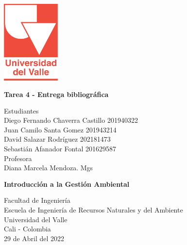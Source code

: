 \begin{titlepage}
    \begin{center}
        \vspace*{1cm}

        \begin{Huge}
        \end{Huge}

        \includegraphics[width=0.22\textwidth]{img/universidadDelValle.png}
        
        \vfill
        \textbf{Tarea 4 - Entrega bibliográfica}\\
        \vfill
        
        Estudiantes\\
        Diego Fernando Chaverra Castillo 201940322\\
        Juan Camilo Santa Gomez 201943214\\
        David Salazar Rodríguez 202181473\\
        Sebastián Afanador Fontal 201629587\\
        \vfill
        Profesora\\
        Diana Marcela Mendoza. Mgs
        
        
        \vfill

        \textbf{Introducción a la Gestión Ambiental}
        
        \vfill
           
        Facultad de Ingeniería\\
        Escuela de Ingeniería de Recursos Naturales y del Ambiente\\
        Universidad del Valle\\
        Cali - Colombia\\
        \vfill
        29 de Abril del 2022

    \end{center}
\end{titlepage}